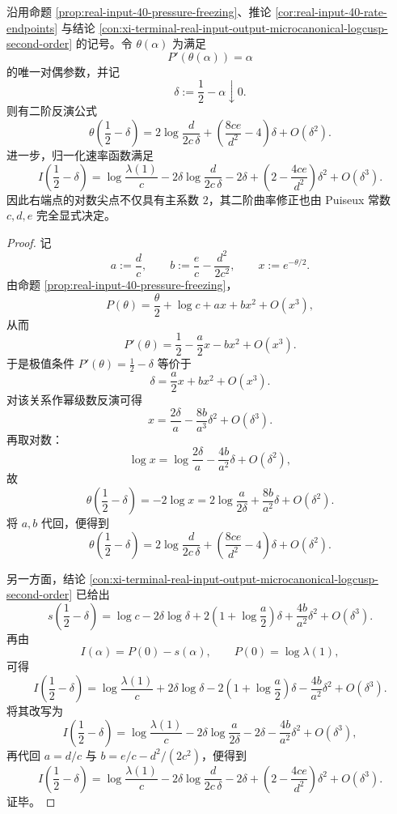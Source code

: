 \begin{theorem}[输出位势右端点对偶参数的二阶反演与速率函数边界正规形]\label{thm:xi-output-potential-right-endpoint-second-order-inversion-normal-form}
沿用命题 \ref{prop:real-input-40-pressure-freezing}、推论 \ref{cor:real-input-40-rate-endpoints} 与结论 \ref{con:xi-terminal-real-input-output-microcanonical-logcusp-second-order} 的记号。令 \(\theta(\alpha)\) 为满足
\[
P'(\theta(\alpha))=\alpha
\]
的唯一对偶参数，并记
\[
\delta:=\frac12-\alpha\downarrow 0.
\]
则有二阶反演公式
\[
\boxed{\;
\theta\!\left(\frac12-\delta\right)
=
2\log\frac{d}{2c\,\delta}
+
\left(\frac{8ce}{d^2}-4\right)\delta
+O(\delta^2).\;}
\]
进一步，归一化速率函数满足
\[
\boxed{\;
I\!\left(\frac12-\delta\right)
=
\log\frac{\lambda(1)}{c}
-2\delta\log\frac{d}{2c\,\delta}
-2\delta
+\left(2-\frac{4ce}{d^2}\right)\delta^2
+O(\delta^3).\;}
\]
因此右端点的对数尖点不仅具有主系数 \(2\)，其二阶曲率修正也由 Puiseux 常数 \(c,d,e\) 完全显式决定。
\end{theorem}
\begin{proof}
记
\[
a:=\frac{d}{c},
\qquad
b:=\frac{e}{c}-\frac{d^2}{2c^2},
\qquad
x:=e^{-\theta/2}.
\]
由命题 \ref{prop:real-input-40-pressure-freezing}，
\[
P(\theta)
=
\frac{\theta}{2}+\log c+a x+b x^2+O(x^3),
\]
从而
\[
P'(\theta)
=
\frac12-\frac{a}{2}x-bx^2+O(x^3).
\]
于是极值条件 \(P'(\theta)=\frac12-\delta\) 等价于
\[
\delta=\frac{a}{2}x+bx^2+O(x^3).
\]
对该关系作幂级数反演可得
\[
x=\frac{2\delta}{a}-\frac{8b}{a^3}\delta^2+O(\delta^3).
\]
再取对数：
\[
\log x
=
\log\frac{2\delta}{a}-\frac{4b}{a^2}\delta+O(\delta^2),
\]
故
\[
\theta\!\left(\frac12-\delta\right)
=
-2\log x
=
2\log\frac{a}{2\delta}+\frac{8b}{a^2}\delta+O(\delta^2).
\]
将 \(a,b\) 代回，便得到
\[
\theta\!\left(\frac12-\delta\right)
=
2\log\frac{d}{2c\,\delta}
+
\left(\frac{8ce}{d^2}-4\right)\delta
+O(\delta^2).
\]

另一方面，结论 \ref{con:xi-terminal-real-input-output-microcanonical-logcusp-second-order} 已给出
\[
s\!\left(\frac12-\delta\right)
=
\log c
-2\delta\log\delta
+2\left(1+\log\frac{a}{2}\right)\delta
+\frac{4b}{a^2}\delta^2
+O(\delta^3).
\]
再由
\[
I(\alpha)=P(0)-s(\alpha),
\qquad
P(0)=\log\lambda(1),
\]
可得
\[
I\!\left(\frac12-\delta\right)
=
\log\frac{\lambda(1)}{c}
+2\delta\log\delta
-2\left(1+\log\frac{a}{2}\right)\delta
-\frac{4b}{a^2}\delta^2
+O(\delta^3).
\]
将其改写为
\[
I\!\left(\frac12-\delta\right)
=
\log\frac{\lambda(1)}{c}
-2\delta\log\frac{a}{2\delta}
-2\delta
-\frac{4b}{a^2}\delta^2
+O(\delta^3),
\]
再代回 \(a=d/c\) 与 \(b=e/c-d^2/(2c^2)\)，便得到
\[
I\!\left(\frac12-\delta\right)
=
\log\frac{\lambda(1)}{c}
-2\delta\log\frac{d}{2c\,\delta}
-2\delta
+\left(2-\frac{4ce}{d^2}\right)\delta^2
+O(\delta^3).
\]
证毕。
\end{proof}

